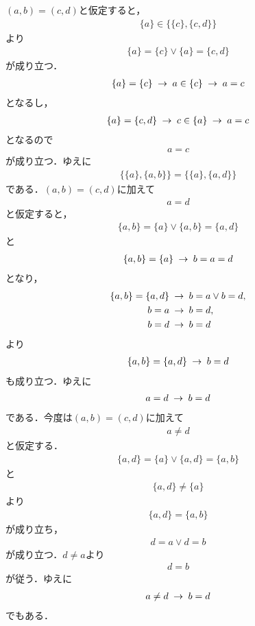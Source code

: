 	\begin{sketch}
		$(a,b) = (c,d)$と仮定すると，
		\begin{align}
			\{a\} \in \{\{c\},\{c,d\}\}
		\end{align}
		より
		\begin{align}
			\{a\} = \{c\} \vee \{a\} = \{c,d\}
		\end{align}
		が成り立つ．
		\begin{align}
			\{a\} = \{c\} \hspace{0.25em}\rightarrow\hspace{0.25em} a \in \{c\} \hspace{0.25em}\rightarrow\hspace{0.25em} a = c
		\end{align}
		となるし，
		\begin{align}
			\{a\} = \{c,d\} \hspace{0.25em}\rightarrow\hspace{0.25em} c \in \{a\} \hspace{0.25em}\rightarrow\hspace{0.25em} a = c
		\end{align}
		となるので
		\begin{align}
			a = c
		\end{align}
		が成り立つ．ゆえに
		\begin{align}
			\{\{a\},\{a,b\}\} = \{\{a\},\{a,d\}\}
		\end{align}
		である．$(a,b) = (c,d)$に加えて
		\begin{align}
			a = d
		\end{align}
		と仮定すると，
		\begin{align}
			\{a,b\} = \{a\} \vee \{a,b\} = \{a,d\}
		\end{align}
		と
		\begin{align}
			\{a,b\} = \{a\} \hspace{0.25em}\rightarrow\hspace{0.25em} b = a = d
		\end{align}
		となり，
		\begin{align}
			\{a,b\} = \{a,d\} &\hspace{0.25em}\rightarrow\hspace{0.25em} b = a \vee b = d, \\
			b = a &\hspace{0.25em}\rightarrow\hspace{0.25em} b = d, \\
			b = d &\hspace{0.25em}\rightarrow\hspace{0.25em} b = d
		\end{align}
		より
		\begin{align}
			\{a,b\} = \{a,d\} \hspace{0.25em}\rightarrow\hspace{0.25em} b = d
		\end{align}
		も成り立つ．ゆえに
		\begin{align}
			a = d \hspace{0.25em}\rightarrow\hspace{0.25em} b = d
		\end{align}
		である．今度は$(a,b) = (c,d)$に加えて
		\begin{align}
			a \neq d
		\end{align}
		と仮定する．
		\begin{align}
			\{a,d\} = \{a\} \vee \{a,d\} = \{a,b\}
		\end{align}
		と
		\begin{align}
			\{a,d\} \neq \{a\}
		\end{align}
		より
		\begin{align}
			\{a,d\} = \{a,b\}
		\end{align}
		が成り立ち，
		\begin{align}
			d = a \vee d = b
		\end{align}
		が成り立つ．$d \neq a$より
		\begin{align}
			d = b
		\end{align}
		が従う．ゆえに
		\begin{align}
			a \neq d \hspace{0.25em}\rightarrow\hspace{0.25em} b = d
		\end{align}
		でもある．
		\QED
	\end{sketch}